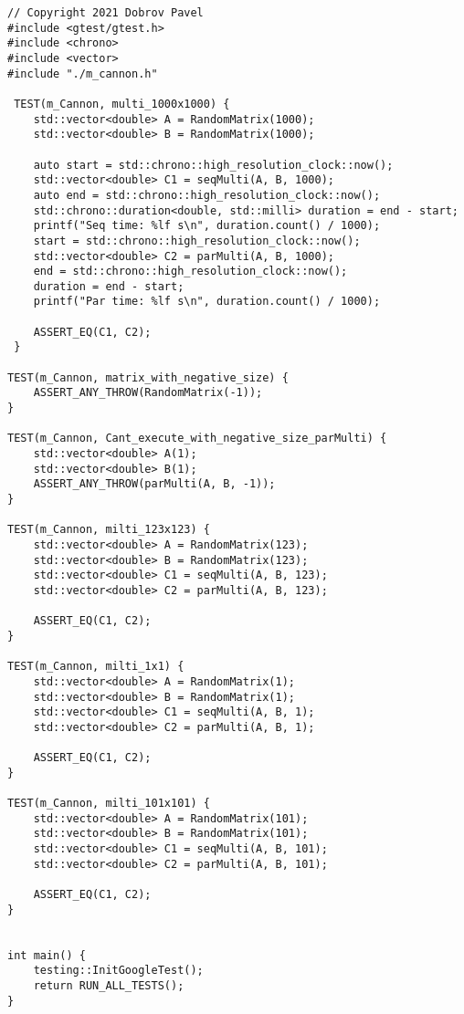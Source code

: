 \documentclass{report}
\begin{document}
\begin{lstlisting}
// Copyright 2021 Dobrov Pavel
#include <gtest/gtest.h>
#include <chrono>
#include <vector>
#include "./m_cannon.h"

 TEST(m_Cannon, multi_1000x1000) {
    std::vector<double> A = RandomMatrix(1000);
    std::vector<double> B = RandomMatrix(1000);

    auto start = std::chrono::high_resolution_clock::now();
    std::vector<double> C1 = seqMulti(A, B, 1000);
    auto end = std::chrono::high_resolution_clock::now();
    std::chrono::duration<double, std::milli> duration = end - start;
    printf("Seq time: %lf s\n", duration.count() / 1000);
    start = std::chrono::high_resolution_clock::now();
    std::vector<double> C2 = parMulti(A, B, 1000);
    end = std::chrono::high_resolution_clock::now();
    duration = end - start;
    printf("Par time: %lf s\n", duration.count() / 1000);

    ASSERT_EQ(C1, C2);
 }

TEST(m_Cannon, matrix_with_negative_size) {
    ASSERT_ANY_THROW(RandomMatrix(-1));
}

TEST(m_Cannon, Cant_execute_with_negative_size_parMulti) {
    std::vector<double> A(1);
    std::vector<double> B(1);
    ASSERT_ANY_THROW(parMulti(A, B, -1));
}

TEST(m_Cannon, milti_123x123) {
    std::vector<double> A = RandomMatrix(123);
    std::vector<double> B = RandomMatrix(123);
    std::vector<double> C1 = seqMulti(A, B, 123);
    std::vector<double> C2 = parMulti(A, B, 123);

    ASSERT_EQ(C1, C2);
}

TEST(m_Cannon, milti_1x1) {
    std::vector<double> A = RandomMatrix(1);
    std::vector<double> B = RandomMatrix(1);
    std::vector<double> C1 = seqMulti(A, B, 1);
    std::vector<double> C2 = parMulti(A, B, 1);

    ASSERT_EQ(C1, C2);
}

TEST(m_Cannon, milti_101x101) {
    std::vector<double> A = RandomMatrix(101);
    std::vector<double> B = RandomMatrix(101);
    std::vector<double> C1 = seqMulti(A, B, 101);
    std::vector<double> C2 = parMulti(A, B, 101);

    ASSERT_EQ(C1, C2);
}


int main() {
    testing::InitGoogleTest();
    return RUN_ALL_TESTS();
}
\end{lstlisting}
\end{document}
